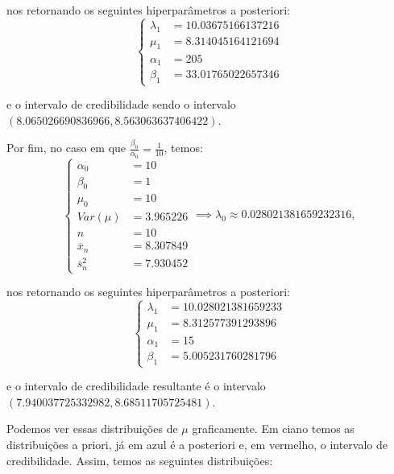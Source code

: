 \documentclass{article}
\begin{document}
\noindent nos retornando os seguintes hiperparâmetros a posteriori:
\begin{equation*}
    \left\{
        \begin{array}{ll}
            \lambda_1 & = 10.03675166137216 \\
            \mu_1 & = 8.314045164121694 \\
            \alpha_1 & = 205 \\
            \beta_1 & = 33.01765022657346
        \end{array}
    \right.
\end{equation*}

\noindent e o intervalo de credibilidade sendo o intervalo $(8.065026690836966, 8.563063637406422)$.

Por fim, no caso em que $\frac{\beta_0}{\alpha_0} = \frac{1}{10}$, temos:
\begin{equation*}
    \left\{
        \begin{array}{ll}
            \alpha_0 & = 10 \\
            \beta_0 & = 1 \\
            \mu_0 & = 10 \\
            Var(\mu) & = 3.965226 \\
            n & = 10 \\
            \overline{x}_n & = 8.307849 \\
            \overline{s}_n^2 & = 7.930452
        \end{array}
    \right.
    \implies \lambda_0 \approx 0.028021381659232316,
\end{equation*}

\noindent nos retornando os seguintes hiperparâmetros a posteriori:
\begin{equation*}
    \left\{
        \begin{array}{ll}
            \lambda_1 & = 10.028021381659233 \\
            \mu_1 & = 8.312577391293896 \\
            \alpha_1 & = 15 \\
            \beta_1 & = 5.005231760281796
        \end{array}
    \right.
\end{equation*}

\noindent e o intervalo de credibilidade resultante é o intervalo $(7.940037725332982, 8.68511705725481)$.

Podemos ver essas distribuições de $\mu$ graficamente. Em ciano temos as distribuições a priori, já em azul é a posteriori e, em vermelho, o intervalo de credibilidade. Assim, temos as seguintes distribuições:
\end{document}
